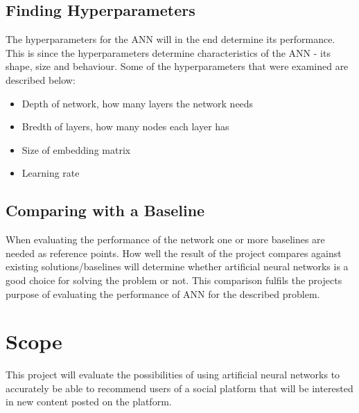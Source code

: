 \subsection{Finding Hyperparameters}
The hyperparameters for the ANN will in the end determine its performance. This is since the hyperparameters determine characteristics of the ANN - its shape, size and behaviour. Some of the hyperparameters that were  examined are described below:
\vspace*{0.25cm}
\begin{itemize}
    \item Depth of network, how many layers the network needs
    \item Bredth of layers, how many nodes each layer has
    \item Size of embedding matrix
    \item Learning rate
\end{itemize}

\subsection{Comparing with a Baseline}
When evaluating the performance of the network one or more baselines are needed as reference points. How well the result of the project compares against existing solutions/baselines will determine whether artificial neural networks is a good choice for solving the problem or not. This comparison fulfils the projects purpose of evaluating the performance of ANN for the described problem.

\section{Scope}
This project will evaluate the possibilities of using artificial neural networks to accurately be able to recommend users of a social platform that will be interested in new content posted on the platform.

